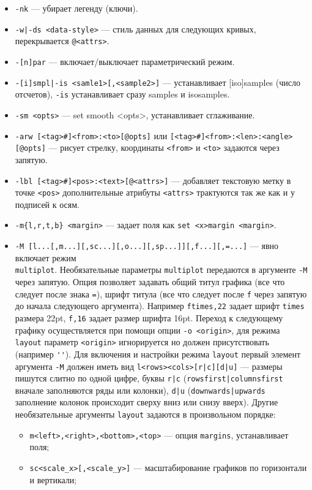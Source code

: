 \documentclass[12pt]{article}
\begin{document}
\begin{itemize}
\item \verb'-nk' --- убирает легенду (ключи). 
\item \verb'-w|-ds <data-style>'  --- стиль данных для следующих кривых, перекрывается \verb'@<attrs>'.
\item \verb'-[n]par' --- включает/выключает параметрический режим.
\item \verb'-[i]smpl|-is <samle1>[,<sample2>]' --- устанавливает [iso]samples (число отсчетов), 
  \verb'-is' устанавливает сразу samples и isosamples.
\item \verb'-sm <opts>' --- set smooth <opts>, устанавливает сглаживание.
\item \verb'-arw [<tag>#]<from>:<to>[@opts]' или \verb'[<tag>#]<from>:<len>:<angle>[@opts]' --- рисует стрелку,
  координаты \verb'<from>' и \verb'<to>' задаются через запятую.
\item \verb'-lbl [<tag>#]<pos>:<text>[@<attrs>]' --- добавляет текстовую метку в точке \verb'<pos>'
   дополнительные атрибуты \verb'<attrs>' трактуются так же как и у подписей к осям.
\item \verb'-m{l,r,t,b} <margin>' ---  задает поля как \verb'set <x>margin <margin>'.
\item \verb'-M [l...[,m...][,sc...][,o...][,sp...]][,f...][,=...]' --- явно включает режим\\ \verb'multiplot'.
Необязательные параметры \verb'multiplot' передаются в аргументе \verb'-M'  через запятую.
Опция позволяет задавать общий титул графика (все что следует после знака \verb'='),
шрифт титула (все что следует после \verb'f' через запятую до начала следующего аргумента).
Например \verb'ftimes,22' задает шрифт \verb'times' размера 22pt,  \verb'f,16' задает размер шрифта 16pt.
Переход к следующему графику осуществляется при помощи опции \verb'-o <origin>', для 
режима \verb'layout' параметр  \verb'<origin>' игнорируется но должен присутствовать (например \verb|''|). 
Для включения и настройки режима \verb'layout' первый элемент аргумента \verb'-M' должен иметь вид
\verb'l<rows><cols>[r|с][d|u]' ---  размеры пишутся слитно по одной 
цифре, буквы \verb'r|с' (\verb'rowsfirst|columnsfirst' вначале заполняются ряды или колонки),
\verb'd|u' (\verb'downwards|upwards' заполнение колонок происходит сверху вниз или снизу вверх).
Другие необязательные аргументы \verb'layout' задаются в произвольном порядке:
\begin{itemize}
\item  \verb'm<left>,<right>,<bottom>,<top>' --- опция \verb'margins', устанавливает поля;
\item  \verb'sс<scale_x>[,<scale_y>]' --- масштабирование графиков по горизонтали и вертикали;

\end{itemize}
\end{itemize}
\end{document}
